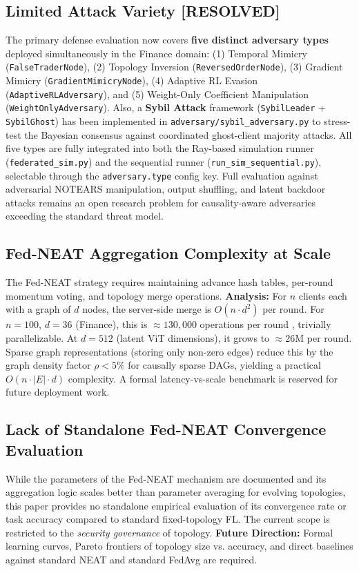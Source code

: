 \documentclass[journal]{IEEEtran}
\begin{document}
\subsection{Limited Attack Variety \textbf{[RESOLVED]}}
The primary defense evaluation now covers \textbf{five distinct adversary types} deployed simultaneously in the Finance domain: (1) Temporal Mimicry (\texttt{FalseTraderNode}), (2) Topology Inversion (\texttt{ReversedOrderNode}), (3) Gradient Mimicry (\texttt{GradientMimicryNode}), (4) Adaptive RL Evasion (\texttt{AdaptiveRLAdversary}), and (5) Weight-Only Coefficient Manipulation (\texttt{WeightOnlyAdversary}). Also, a \textbf{Sybil Attack} framework (\texttt{SybilLeader} + \texttt{SybilGhost}) has been implemented in \texttt{adversary/sybil\_adversary.py} to stress-test the Bayesian consensus against coordinated ghost-client majority attacks. All five types are fully integrated into both the Ray-based simulation runner (\texttt{federated\_sim.py}) and the sequential runner (\texttt{run\_sim\_sequential.py}), selectable through the \texttt{adversary.type} config key. Full evaluation against adversarial NOTEARS manipulation, output shuffling, and latent backdoor attacks remains an open research problem for causality-aware adversaries exceeding the standard threat model.

\subsection{Fed-NEAT Aggregation Complexity at Scale}
The Fed-NEAT strategy requires maintaining advance hash tables, per-round momentum voting, and topology merge operations. \textbf{Analysis:} For $n$ clients each with a graph of $d$ nodes, the server-side merge is $O(n \cdot d^2)$ per round. For $n=100$, $d=36$ (Finance), this is $\approx130{,}000$ operations per round , trivially parallelizable. At $d=512$ (latent ViT dimensions), it grows to $\approx26$M per round. Sparse graph representations (storing only non-zero edges) reduce this by the graph density factor $\rho < 5\%$ for causally sparse DAGs, yielding a practical $O(n \cdot |E| \cdot d)$ complexity. A formal latency-vs-scale benchmark is reserved for future deployment work.

\subsection{Lack of Standalone Fed-NEAT Convergence Evaluation}
While the parameters of the Fed-NEAT mechanism are documented and its aggregation logic scales better than parameter averaging for evolving topologies, this paper provides no standalone empirical evaluation of its convergence rate or task accuracy compared to standard fixed-topology FL. The current scope is restricted to the \emph{security governance} of topology. \textbf{Future Direction:} Formal learning curves, Pareto frontiers of topology size vs. accuracy, and direct baselines against standard NEAT \cite{stanley2002} and standard FedAvg \cite{mcmahan2017} are required.
\end{document}

